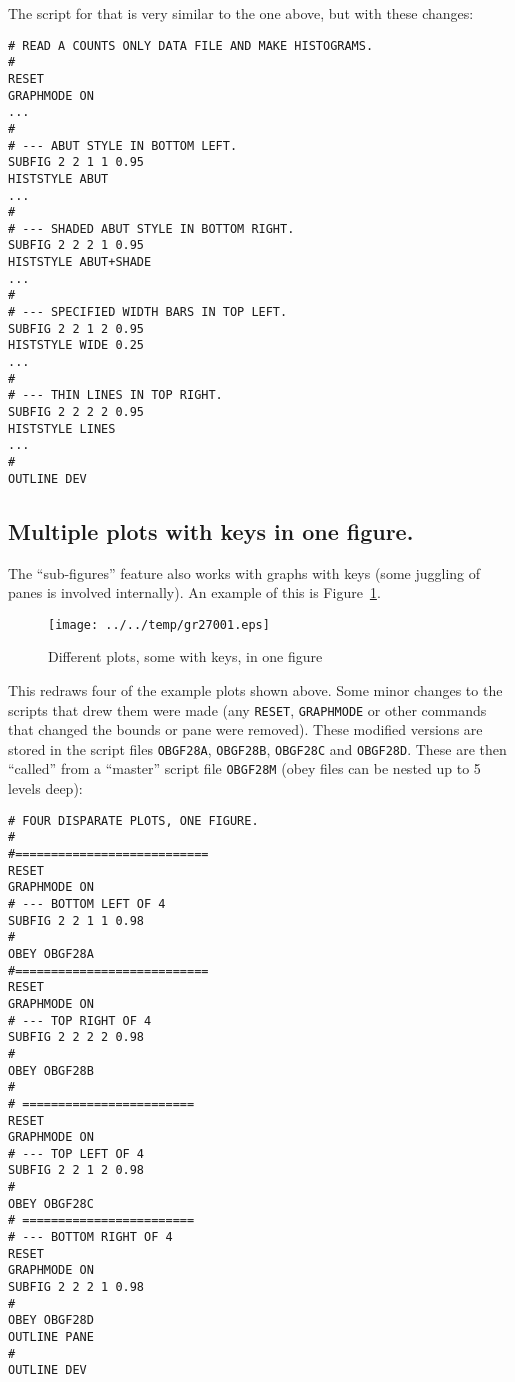\documentclass[a4paper,twoside,11pt]{article}
\makeatletter
\def\maxwidth{%
  \ifdim\Gin@nat@width>\linewidth
    \linewidth
  \else
    \Gin@nat@width
  \fi
}
\newcommand{\newpara}{\par\vspace{4mm}\noindent}
\makeatother
\begin{document}

\newpara
The script for that is very similar to the one above, but with these
changes:

\begin{lstlisting}
# READ A COUNTS ONLY DATA FILE AND MAKE HISTOGRAMS.
#
RESET
GRAPHMODE ON
...
#
# --- ABUT STYLE IN BOTTOM LEFT.
SUBFIG 2 2 1 1 0.95
HISTSTYLE ABUT
...
#
# --- SHADED ABUT STYLE IN BOTTOM RIGHT.
SUBFIG 2 2 2 1 0.95
HISTSTYLE ABUT+SHADE
...
#
# --- SPECIFIED WIDTH BARS IN TOP LEFT.
SUBFIG 2 2 1 2 0.95
HISTSTYLE WIDE 0.25
...
#
# --- THIN LINES IN TOP RIGHT.
SUBFIG 2 2 2 2 0.95
HISTSTYLE LINES
...
#
OUTLINE DEV
\end{lstlisting}


\subsection{Multiple plots with keys in one figure.}\label{multiple-plots-with-keys-in-one-figure.}
\newpara
The ``sub-figures'' feature also works with graphs with keys (some
juggling of panes is involved internally). An example of this is
Figure~\ref{fig:gr27001}.

\begin{figure}
  \centering
  \texttt{[image: ../../temp/gr27001.eps]}
  \caption{Different plots, some with keys, in one figure}
  \label{fig:gr27001}
\end{figure}

\newpara
This redraws four of the example plots shown above. Some minor changes
to the scripts that drew them were made (any \texttt{RESET},
\texttt{GRAPHMODE} or other commands that changed the bounds or pane
were removed). These modified versions are stored in the script files
\texttt{OBGF28A}, \texttt{OBGF28B}, \texttt{OBGF28C} and
\texttt{OBGF28D}. These are then ``called'' from a ``master'' script
file \texttt{OBGF28M} (obey files can be nested up to 5 levels deep):

\begin{lstlisting}
# FOUR DISPARATE PLOTS, ONE FIGURE.
#
#===========================
RESET
GRAPHMODE ON
# --- BOTTOM LEFT OF 4
SUBFIG 2 2 1 1 0.98
#
OBEY OBGF28A
#===========================
RESET
GRAPHMODE ON
# --- TOP RIGHT OF 4
SUBFIG 2 2 2 2 0.98
#
OBEY OBGF28B
#
# ========================
RESET
GRAPHMODE ON
# --- TOP LEFT OF 4
SUBFIG 2 2 1 2 0.98
#
OBEY OBGF28C
# ========================
# --- BOTTOM RIGHT OF 4
RESET
GRAPHMODE ON
SUBFIG 2 2 2 1 0.98
#
OBEY OBGF28D
OUTLINE PANE
#
OUTLINE DEV
\end{lstlisting}
\end{document}
